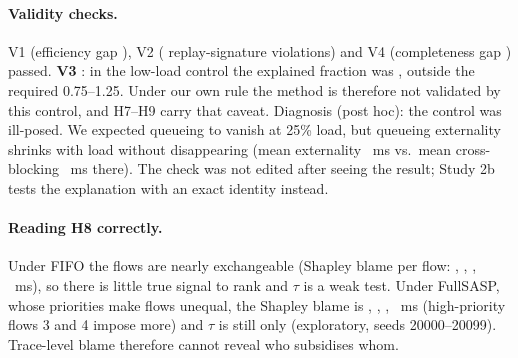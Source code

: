 \documentclass[11pt]{article}
\begin{document}
\paragraph{Validity checks.} V1 (efficiency gap \SBVone{}), V2 (\SBVtwo{} replay-signature violations) and V4 (completeness gap \SBVfour{}) passed. \textbf{V3 \SBVthreeStatus{}}: in the low-load control the explained fraction was \SBVthree{}, outside the required 0.75--1.25. Under our own rule the method is therefore not validated by this control, and H7--H9 carry that caveat. Diagnosis (post hoc): the control was ill-posed. We expected queueing to vanish at 25\% load, but queueing externality shrinks with load without disappearing (mean externality \SBLowE{}~ms vs.\ mean cross-blocking \SBLowX{}~ms there). The check was not edited after seeing the result; Study 2b tests the explanation with an exact identity instead.

\paragraph{Reading H8 correctly.} Under FIFO the flows are nearly exchangeable (Shapley blame per flow: \SBFifoBlameA{}, \SBFifoBlameB{}, \SBFifoBlameC{}, \SBFifoBlameD{}~ms), so there is little true signal to rank and $\tau$ is a weak test. Under FullSASP, whose priorities make flows unequal, the Shapley blame is \SBSaspBlameA{}, \SBSaspBlameB{}, \SBSaspBlameC{}, \SBSaspBlameD{}~ms (high-priority flows 3 and 4 impose more) and $\tau$ is still only \SBSaspTau{} (exploratory, seeds 20000--20099). Trace-level blame therefore cannot reveal who subsidises whom.
\end{document}
